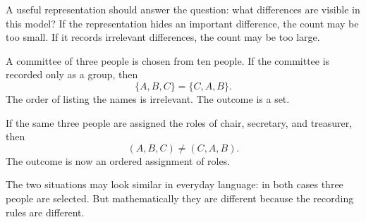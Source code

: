A useful representation should answer the question: what differences are visible in this model? If the representation hides an important difference, the count may be too small. If it records irrelevant differences, the count may be too large.

\begin{examplebox}
A committee of three people is chosen from ten people. If the committee is recorded only as a group, then
\[
\{A,B,C\}=\{C,A,B\}.
\]
The order of listing the names is irrelevant. The outcome is a set.

If the same three people are assigned the roles of chair, secretary, and treasurer, then
\[
(A,B,C)\neq (C,A,B).
\]
The outcome is now an ordered assignment of roles.
\end{examplebox}

The two situations may look similar in everyday language: in both cases three people are selected. But mathematically they are different because the recording rules are different.
